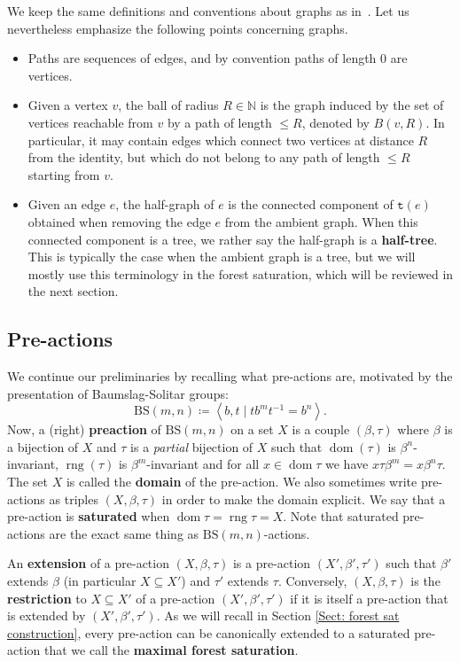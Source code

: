 \documentclass[12pt]{article}
\numberwithin{equation}{section}
\theoremstyle{definition}
\def\defin#1{\textbf{#1}}
\DeclareMathOperator{\dom}{\mathrm{dom}}
\DeclareMathOperator{\rng}{\mathrm{rng}}
\newcommand{\N}{\mathbb{N}}
\newcommand{\la}{\left\langle}
\newcommand{\ra}{\right\rangle}
\newcommand\BSo{\mathrm{BS}}
\newcommand{\target}{\mathtt{t}}
\begin{document}
We keep the same definitions and conventions about graphs as in~\cite{CGLMS-22}. 
Let us nevertheless emphasize the following points concerning graphs.
\begin{itemize}
	\item Paths are sequences of edges, and by convention paths of length \( 0 \) are vertices.
	\item Given a vertex \( v \), the ball of radius \( R\in\N \) is the graph induced by
	the set of vertices reachable from \(v\) by a path of length \( \leq R\), denoted by \(B(v,R)\).
	In particular, it may contain edges which connect two vertices at distance \(R\) from the identity, but which do not belong to any path of length \(\leq R\) starting from \( v \). 

	\item Given an edge \(e\), the half-graph of \(e\) is the connected component of 
	\(\target(e)\) obtained when removing the edge \(e\) from the ambient graph.
	When this connected component is a tree, we rather say the half-graph is a 
	\textbf{half-tree}.
	This is typically the case when the ambient graph is a tree, 
	but we will mostly use this 
	terminology in the forest saturation, which will be reviewed in the next section.
\end{itemize}

\subsection{Pre-actions} 

We continue our preliminaries by recalling what pre-actions are, motivated by the 
presentation of Baumslag-Solitar groups: 
\[
\BSo(m,n) \coloneqq \la b,t\mid t b^m t^{-1}=b^n\ra.
\]
Now, a (right) \defin{preaction} of \( \BSo(m,n) \) on a set \( X \) is a couple \( (\beta,\tau) \)
where \( \beta \) is a bijection of \(X\) and \( \tau \) is a \emph{partial} bijection
 of \(X\) such  that  \(\dom(\tau)\) is \(\beta^n\)-invariant,
\( \rng(\tau) \) is \( \beta^m \)-invariant and for all \(x\in\dom\tau\) we have
\( x \tau \beta^m = x\beta^n \tau \).
 The set \( X \) is called the \textbf{domain} of the pre-action.
 We also sometimes write pre-actions as triples \( (X,\beta,\tau) \)
 in order to make the domain explicit.
 We say that a pre-action is \textbf{saturated} when \(\dom\tau=\rng\tau=X\).
 Note that saturated pre-actions are the exact same thing as \(\BSo(m,n)\)-actions.

An \textbf{extension} of a pre-action \((X,\beta,\tau)\) is a pre-action \((X',\beta',\tau')\) such
that \(\beta'\) extends \(\beta\) (in particular \( X\subseteq X' \)) and \( \tau' \)
extends \(\tau\). 
Conversely, \((X,\beta,\tau)\) is the \textbf{restriction} to \( X\subseteq X' \) of a pre-action \((X',\beta',\tau')\) if it is itself a pre-action that is extended by \((X',\beta',\tau')\).
As we will recall in Section \ref{Sect: forest sat construction}, every pre-action can be canonically extended to a saturated pre-action that we call the \textbf{maximal forest saturation}.
\end{document}
